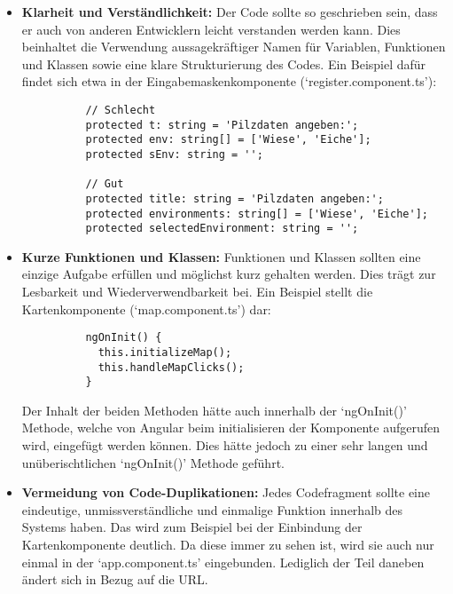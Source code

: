 \begin{itemize}

	\item \textbf{Klarheit und Verständlichkeit:}
	      Der Code sollte so geschrieben sein, dass er auch von anderen Entwicklern leicht verstanden werden kann. Dies beinhaltet die Verwendung aussagekräftiger
	      Namen für Variablen, Funktionen und Klassen sowie eine klare Strukturierung des Codes. Ein Beispiel dafür findet sich etwa in der Eingabemaskenkomponente
	      (`register.component.ts'):

	      \begin{verbatim}
          // Schlecht
          protected t: string = 'Pilzdaten angeben:';
          protected env: string[] = ['Wiese', 'Eiche'];
          protected sEnv: string = '';

          // Gut
          protected title: string = 'Pilzdaten angeben:';
          protected environments: string[] = ['Wiese', 'Eiche'];
          protected selectedEnvironment: string = '';
        \end{verbatim}

	\item \textbf{Kurze Funktionen und Klassen:}
	      Funktionen und Klassen sollten eine einzige Aufgabe erfüllen und möglichst kurz gehalten werden. Dies trägt zur Lesbarkeit und Wiederverwendbarkeit bei.
	      Ein Beispiel stellt die Kartenkomponente (`map.component.ts') dar:

	      \begin{verbatim}
          ngOnInit() {
            this.initializeMap();
            this.handleMapClicks();
          }
        \end{verbatim}

	      Der Inhalt der beiden Methoden hätte auch innerhalb der `ngOnInit()' Methode, welche von Angular beim initialisieren der Komponente aufgerufen wird,
	      eingefügt werden können. Dies hätte jedoch zu einer sehr langen und unüberischtlichen `ngOnInit()' Methode geführt.

	\item \textbf{Vermeidung von Code-Duplikationen:}
	      Jedes Codefragment sollte eine eindeutige, unmissverständliche und einmalige Funktion innerhalb des Systems haben. Das wird zum Beispiel bei der Einbindung
	      der Kartenkomponente deutlich. Da diese immer zu sehen ist, wird sie auch nur einmal in der `app.component.ts' eingebunden. Lediglich der Teil daneben ändert
	      sich in Bezug auf die URL.


\end{itemize}
